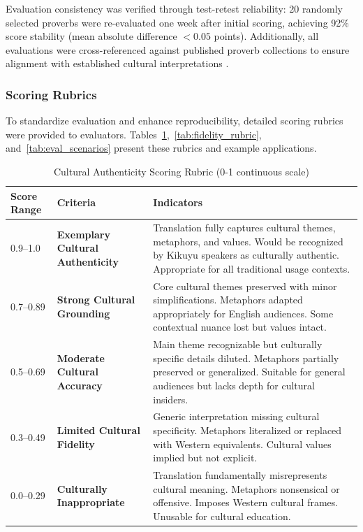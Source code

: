 Evaluation consistency was verified through test-retest reliability: 20 randomly selected proverbs were re-evaluated one week after initial scoring, achieving 92\% score stability (mean absolute difference $< 0.05$ points). Additionally, all evaluations were cross-referenced against published proverb collections to ensure alignment with established cultural interpretations \cite{ireri2019proverbs, gikandi2005thousand}.

\subsubsection{Scoring Rubrics}
\label{subsubsec:scoring_rubrics}

To standardize evaluation and enhance reproducibility, detailed scoring rubrics were provided to evaluators. Tables~\ref{tab:cultural_rubric},~\ref{tab:fidelity_rubric}, and~\ref{tab:eval_scenarios} present these rubrics and example applications.

\begin{table}[p]
\centering
\small
\begin{tabular}{p{1.5cm}p{5cm}p{6cm}}
\hline
\textbf{Score Range} & \textbf{Criteria} & \textbf{Indicators} \\
\hline
0.9--1.0 & \textbf{Exemplary Cultural Authenticity} & Translation fully captures cultural themes, metaphors, and values. Would be recognized by Kikuyu speakers as culturally authentic. Appropriate for all traditional usage contexts. \\
\hline
0.7--0.89 & \textbf{Strong Cultural Grounding} & Core cultural themes preserved with minor simplifications. Metaphors adapted appropriately for English audiences. Some contextual nuance lost but values intact. \\
\hline
0.5--0.69 & \textbf{Moderate Cultural Accuracy} & Main theme recognizable but culturally specific details diluted. Metaphors partially preserved or generalized. Suitable for general audiences but lacks depth for cultural insiders. \\
\hline
0.3--0.49 & \textbf{Limited Cultural Fidelity} & Generic interpretation missing cultural specificity. Metaphors literalized or replaced with Western equivalents. Cultural values implied but not explicit. \\
\hline
0.0--0.29 & \textbf{Culturally Inappropriate} & Translation fundamentally misrepresents cultural meaning. Metaphors nonsensical or offensive. Imposes Western cultural frames. Unusable for cultural education. \\
\hline
\end{tabular}
\caption{Cultural Authenticity Scoring Rubric (0-1 continuous scale)}
\label{tab:cultural_rubric}
\end{table}


